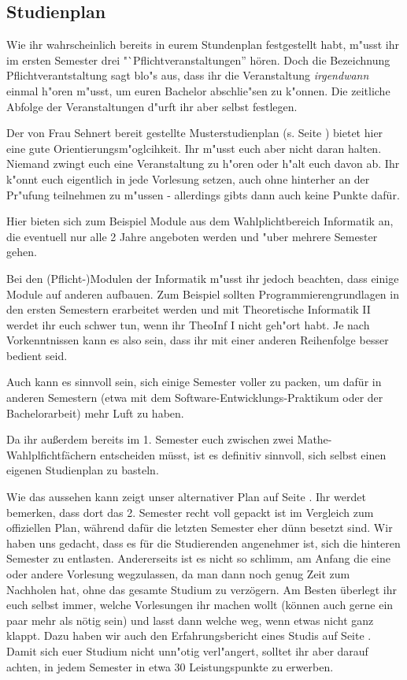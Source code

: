 \subsection{Studienplan}
\label{bach_studienplan}
Wie ihr wahrscheinlich bereits in eurem Stundenplan festgestellt habt,
m"usst ihr im ersten Semester drei "`Pflichtveranstaltungen'' hören.  
Doch die Bezeichnung Pflichtverantstaltung sagt blo"s aus, dass ihr die Veranstaltung \emph{irgendwann} einmal h"oren m"usst, um euren Bachelor abschlie"sen zu k"onnen.
Die zeitliche Abfolge der Veranstaltungen d"urft ihr aber selbst festlegen.

Der von Frau Sehnert bereit gestellte Musterstudienplan (s. Seite \pageref{musterstudienplan}) bietet hier eine gute Orientierungsm"oglcihkeit.
Ihr m"usst euch aber nicht daran halten. Niemand zwingt euch eine Veranstaltung zu h"oren oder h"alt euch davon ab.
Ihr k"onnt euch eigentlich in jede Vorlesung setzen, auch ohne
hinterher an der Pr"ufung teilnehmen zu m"ussen - allerdings gibts
dann auch keine Punkte dafür. 

Hier bieten sich zum Beispiel Module aus dem Wahlplichtbereich Informatik an, die eventuell nur alle 2 Jahre angeboten werden und "uber mehrere Semester gehen.

Bei den (Pflicht-)Modulen der Informatik m"usst ihr jedoch beachten, dass einige Module auf anderen aufbauen.
Zum Beispiel sollten Programmierengrundlagen in den ersten  Semestern
erarbeitet werden und mit Theoretische Informatik II werdet ihr euch
schwer tun, wenn ihr TheoInf I nicht geh"ort habt.
Je nach Vorkenntnissen kann es also sein,
dass ihr mit einer anderen Reihenfolge besser bedient seid. 

Auch kann
es sinnvoll sein, sich einige Semester voller zu packen, um dafür in
anderen Semestern (etwa mit dem Software-Entwicklungs-Praktikum oder
der Bachelorarbeit) mehr Luft zu haben. 

Da ihr außerdem bereits im
1. Semester euch zwischen zwei Mathe-Wahlplfichtfächern entscheiden
müsst, ist es definitiv sinnvoll, sich selbst einen eigenen
Studienplan zu basteln. 

Wie das aussehen kann zeigt unser alternativer
Plan auf Seite \pageref{studienplan_neu}. Ihr werdet bemerken, dass
dort das 2. Semester recht voll gepackt ist im Vergleich zum
offiziellen Plan, während dafür die letzten Semester eher dünn besetzt
sind. Wir haben uns gedacht, dass es für die Studierenden angenehmer
ist, sich die hinteren Semester zu entlasten. Andererseits ist es
nicht so schlimm, am Anfang die eine oder andere Vorlesung
wegzulassen, da man dann noch genug Zeit zum Nachholen hat, ohne das
gesamte Studium zu verzögern. Am Besten überlegt ihr euch selbst immer,
welche Vorlesungen ihr machen wollt (können auch gerne ein paar mehr
als nötig sein) und lasst dann welche weg, wenn etwas nicht ganz
klappt. Dazu haben wir auch den Erfahrungsbericht eines Studis auf
Seite \pageref{studienplan_bericht}. 
\\
Damit sich euer Studium nicht unn"otig verl"angert, solltet ihr aber darauf achten, in jedem Semester in etwa 30 Leistungspunkte zu erwerben. 


